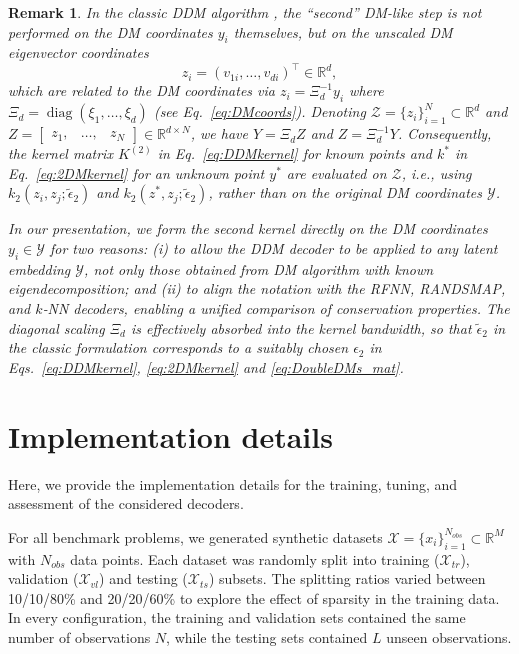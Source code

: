 \documentclass{article}
\newtheorem{remark}{Remark}
\begin{document}
\begin{remark}
    In the classic DDM algorithm \cite{evangelou2022double}, the ``second'' DM-like step is not performed on the DM coordinates $y_i$ themselves, but on the unscaled DM eigenvector coordinates
    \begin{equation}
        z_i = (v_{1i}, \ldots, v_{di})^\top \in \mathbb{R}^d,
    \end{equation}
    which are related to the DM coordinates via $z_i=\Xi_d^{-1} y_i$ where $\Xi_d = \operatorname{diag}(\xi_1,\ldots,\xi_d)$ (see Eq.~\eqref{eq:DMcoords}). Denoting $\mathcal{Z}=\{ z_i \}_{i=1}^N \subset \mathbb{R}^d$ and $Z = \begin{bmatrix} z_1, & \ldots, & z_N \end{bmatrix} \in \mathbb{R}^{d \times N}$, we have $Y = \Xi_d Z$ and $Z = \Xi_d^{-1} Y$. Consequently, the kernel matrix $K^{(2)}$ in Eq.~\eqref{eq:DDMkernel} for known points and $k^*$ in Eq.~\eqref{eq:2DMkernel} for an unknown point $y^*$ are evaluated on $\mathcal{Z}$, i.e., using $k_2(z_i, z_j; \tilde{\epsilon}_2)$ and $k_2(z^*, z_j; \tilde{\epsilon}_2)$, rather than on the original DM coordinates $\mathcal{Y}$. 

    In our presentation, we form the second kernel directly on the DM coordinates $y_i\in \mathcal{Y}$ for two reasons: (i) to allow the DDM decoder to be applied to any latent embedding $\mathcal{Y}$, not only those obtained from DM algorithm with known eigendecomposition; and (ii) to align the notation with the RFNN, RANDSMAP, and $k$‑NN decoders, enabling a unified comparison of conservation properties. The diagonal scaling $\Xi_d$ is effectively absorbed into the kernel bandwidth, so that $\tilde{\epsilon}_2$ in the classic formulation corresponds to a suitably chosen $\epsilon_2$ in Eqs.~\eqref{eq:DDMkernel}, \eqref{eq:2DMkernel} and \eqref{eq:DoubleDMs_mat}.
\end{remark}

\renewcommand{\theequation}{D.\arabic{equation}}
\renewcommand{\thefigure}{D.\arabic{figure}}
\renewcommand{\thetable}{D.\arabic{table}}
\setcounter{equation}{0}
\setcounter{figure}{0}
\setcounter{table}{0}
\section{Implementation details} \label{app:ImpDet}
Here, we provide the implementation details for the training, tuning, and assessment of the considered decoders.

For all benchmark problems, we generated synthetic datasets $\mathcal{X}=\{x_i\}_{i=1}^{N_{obs}}\subset \mathbb{R}^M$ with $N_{obs}$ data points. Each dataset was randomly split into training ($\mathcal{X}_{tr}$), validation ($\mathcal{X}_{vl}$) and testing ($\mathcal{X}_{ts}$) subsets. The splitting ratios varied between 10/10/80\% and 20/20/60\% to explore the effect of sparsity in the training data. In every configuration, the training and validation sets contained the same number of observations $N$, while the testing sets contained $L$ unseen observations.
\end{document}

